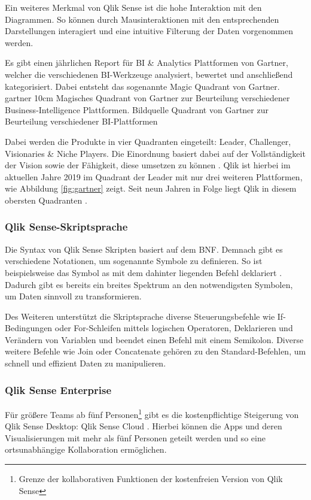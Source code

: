 Ein weiteres Merkmal von Qlik Sense ist die hohe Interaktion mit den Diagrammen.
So können durch Mausinteraktionen mit den entsprechenden Darstellungen interagiert und eine intuitive Filterung der Daten vorgenommen werden.

Es gibt einen jährlichen Report für \gls{BI} \& Analytics Plattformen von Gartner, welcher die verschiedenen BI-Werkzeuge analysiert, bewertet und anschließend kategorisiert.
Dabei entsteht das sogenannte \glqq Magic Quadrant\grqq{} von Gartner.
\bild
{gartner}
{10cm}
{Magisches Quadrant von Gartner zur Beurteilung verschiedener Business-Intelligence Plattformen. Bildquelle \cite{Howson.Februar2019}}
{Quadrant von Gartner zur Beurteilung verschiedener BI-Plattformen}

Dabei werden die Produkte in vier Quadranten eingeteilt: Leader, Challenger, Visionaries \& Niche Players.
Die Einordnung basiert dabei auf der Vollständigkeit der Vision sowie der Fähigkeit, diese umsetzen zu können \cite{Howson.Februar2019}.
Qlik ist hierbei im aktuellen Jahre 2019 im Quadrant der \glqq Leader\grqq{} mit nur drei weiteren Plattformen, wie Abbildung \ref{fig:gartner} zeigt.
Seit neun Jahren in Folge liegt Qlik in diesem obersten Quadranten \cite{QlikTech.2019}.

\subsubsection{Qlik Sense-Skriptsprache}
Die Syntax von Qlik Sense Skripten basiert auf dem \gls{BNF}. 
Demnach gibt es verschiedene Notationen, um sogenannte \glqq Symbole\grqq{} zu definieren.
So ist beispielsweise das Symbol \glqq as\grqq{} mit dem dahinter liegenden Befehl  deklariert \cite{QlikTech.Februar2019}.
Dadurch gibt es bereits ein breites Spektrum an den notwendigsten Symbolen, um Daten sinnvoll zu transformieren.

Des Weiteren unterstützt die Skriptsprache diverse Steuerungsbefehle wie If-Bedingungen oder For-Schleifen mittels logischen Operatoren, Deklarieren und Verändern von Variablen und beendet einen Befehl mit einem Semikolon.
Diverse weitere Befehle wie \glqq Join\grqq{} oder \glqq Concatenate\grqq{} gehören zu den Standard-Befehlen, um schnell und effizient Daten zu manipulieren.

\subsubsection{Qlik Sense Enterprise}
\label{subsub:enterprise}
Für größere Teams ab fünf Personen\footnote{Grenze der kollaborativen Funktionen der kostenfreien Version von Qlik Sense} gibt es die kostenpflichtige Steigerung von Qlik Sense Desktop: Qlik Sense Cloud \cite{QlikTech.2019}.
Hierbei können die Apps und deren Visualisierungen mit mehr als fünf Personen geteilt werden und so eine ortsunabhängige Kollaboration ermöglichen.

